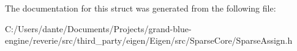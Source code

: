The documentation for this struct was generated from the following file\+:\begin{DoxyCompactItemize}
\item 
C\+:/\+Users/dante/\+Documents/\+Projects/grand-\/blue-\/engine/reverie/src/third\+\_\+party/eigen/\+Eigen/src/\+Sparse\+Core/Sparse\+Assign.\+h\end{DoxyCompactItemize}
